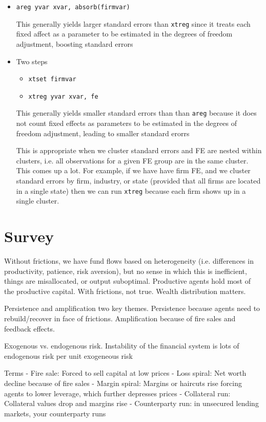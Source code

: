 \documentclass[12pt]{article}
\theoremstyle{plain}
\theoremstyle{definition}
\theoremstyle{remark}
\begin{document}
\begin{itemize}
  \item \texttt{areg yvar xvar, absorb(firmvar)}

    This generally yields larger standard errors than \texttt{xtreg}
    since it treats each fixed affect as a parameter to be estimated in
    the degrees of freedom adjustment, boosting standard errors
  \item Two steps
    \begin{itemize}
      \item \texttt{xtset firmvar}
      \item \texttt{xtreg yvar xvar, fe}
    \end{itemize}
    This generally yields smaller standard errors than than
    \texttt{areg} because it does not count fixed effects as parameters
    to be estimated in the degrees of freedom adjustment, leading to
    smaller standard erorrs

    This is appropriate when we cluster standard errors and FE are
    nested within clusters, i.e. all observations for a given FE group
    are in the same cluster.
    This comes up a lot.
    For example, if we have have firm FE, and we cluster standard errors
    by firm, industry, or state (provided that all firms are located in
    a single state) then we can run \texttt{xtreg}
    because each firm shows up in a single cluster.
\end{itemize}



\clearpage
\section{Survey}

Without frictions, we have fund flows based on heterogeneity (i.e.
differences in productivity, patience, risk aversion), but no
sense in which this is inefficient, things are misallocated, or output
suboptimal.
Productive agents hold most of the productive capital.
With frictions, not true.
Wealth distribution matters.

Persistence and amplification two key themes.
Persistence because agents need to rebuild/recover in face of frictions.
Amplification because of fire sales and feedback effects.

Exogenous vs. endogenous risk. Instability of the financial system is
lots of endogenous risk per unit exogeneous risk

Terms
- Fire sale: Forced to sell capital at low prices
- Loss spiral: Net worth decline because of fire sales
- Margin spiral: Margins or haircuts rise forcing agents to lower
leverage, which further depresses prices
- Collateral run: Collateral values drop and margins rise
- Counterparty run: in unsecured lending markets, your counterparty runs
\end{document}
